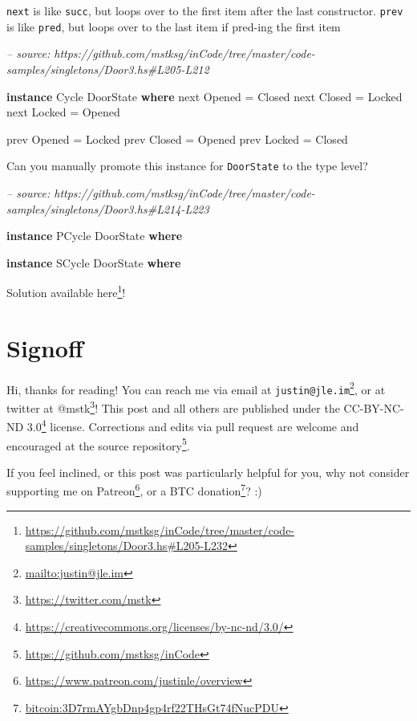 \documentclass[]{article}
\newenvironment{Shaded}{}{}
\newcommand{\CommentTok}[1]{\textcolor[rgb]{0.38,0.63,0.69}{\textit{#1}}}
\newcommand{\DataTypeTok}[1]{\textcolor[rgb]{0.56,0.13,0.00}{#1}}
\newcommand{\FunctionTok}[1]{\textcolor[rgb]{0.02,0.16,0.49}{#1}}
\newcommand{\KeywordTok}[1]{\textcolor[rgb]{0.00,0.44,0.13}{\textbf{#1}}}
\newcommand{\NormalTok}[1]{#1}
\renewcommand{\href}[2]{#2\footnote{\url{#1}}}
\begin{document}
\begin{enumerate}
  \texttt{next} is like \texttt{succ}, but loops over to the first item after
  the last constructor. \texttt{prev} is like \texttt{pred}, but loops over to
  the last item if pred-ing the first item

\begin{Shaded}
\begin{Highlighting}[]
\CommentTok{-- source: https://github.com/mstksg/inCode/tree/master/code-samples/singletons/Door3.hs#L205-L212}

\KeywordTok{instance} \DataTypeTok{Cycle} \DataTypeTok{DoorState} \KeywordTok{where}
\NormalTok{    next }\DataTypeTok{Opened} \FunctionTok{=} \DataTypeTok{Closed}
\NormalTok{    next }\DataTypeTok{Closed} \FunctionTok{=} \DataTypeTok{Locked}
\NormalTok{    next }\DataTypeTok{Locked} \FunctionTok{=} \DataTypeTok{Opened}

\NormalTok{    prev }\DataTypeTok{Opened} \FunctionTok{=} \DataTypeTok{Locked}
\NormalTok{    prev }\DataTypeTok{Closed} \FunctionTok{=} \DataTypeTok{Opened}
\NormalTok{    prev }\DataTypeTok{Locked} \FunctionTok{=} \DataTypeTok{Closed}
\end{Highlighting}
\end{Shaded}

  Can you manually promote this instance for \texttt{DoorState} to the type
  level?

\begin{Shaded}
\begin{Highlighting}[]
\CommentTok{-- source: https://github.com/mstksg/inCode/tree/master/code-samples/singletons/Door3.hs#L214-L223}

\KeywordTok{instance} \DataTypeTok{PCycle} \DataTypeTok{DoorState} \KeywordTok{where}

\KeywordTok{instance} \DataTypeTok{SCycle} \DataTypeTok{DoorState} \KeywordTok{where}
\end{Highlighting}
\end{Shaded}

  Solution available
  \href{https://github.com/mstksg/inCode/tree/master/code-samples/singletons/Door3.hs\#L205-L232}{here}!
\end{enumerate}

\hypertarget{signoff}{%
\section{Signoff}\label{signoff}}

Hi, thanks for reading! You can reach me via email at
\href{mailto:justin@jle.im}{\nolinkurl{justin@jle.im}}, or at twitter at
\href{https://twitter.com/mstk}{@mstk}! This post and all others are published
under the \href{https://creativecommons.org/licenses/by-nc-nd/3.0/}{CC-BY-NC-ND
3.0} license. Corrections and edits via pull request are welcome and encouraged
at \href{https://github.com/mstksg/inCode}{the source repository}.

If you feel inclined, or this post was particularly helpful for you, why not
consider \href{https://www.patreon.com/justinle/overview}{supporting me on
Patreon}, or a \href{bitcoin:3D7rmAYgbDnp4gp4rf22THsGt74fNucPDU}{BTC donation}?
:)
\end{document}
